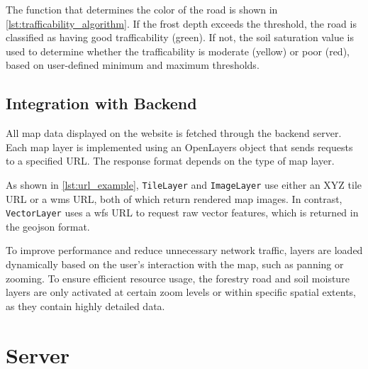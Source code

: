 The function that determines the color of the road is shown in \autoref{lst:trafficability_algorithm}. If the frost depth exceeds the threshold, the road is classified as having good trafficability (green). If not, the soil saturation value is used to determine whether the trafficability is moderate (yellow) or poor (red), based on user-defined minimum and maximum thresholds.

\begin{figure}[h]

\end{figure}

\begin{figure}[h]

\end{figure}

\subsection{Integration with Backend}

All map data displayed on the website is fetched through the backend server. Each map layer is implemented using an OpenLayers object that sends requests to a specified URL. The response format depends on the type of map layer.

As shown in \autoref{lst:url_example}, \texttt{TileLayer} and \texttt{ImageLayer} use either an XYZ tile URL or a \gls{wms} URL, both of which return rendered map images. In contrast, \texttt{VectorLayer} uses a \gls{wfs} URL to request raw vector features, which is returned in the \gls{geojson} format.

\begin{figure}[h]

\end{figure}

To improve performance and reduce unnecessary network traffic, layers are loaded dynamically based on the user's interaction with the map, such as panning or zooming. To ensure efficient resource usage, the forestry road and soil moisture layers are only activated at certain zoom levels or within specific spatial extents, as they contain highly detailed data.

\section{Server}\label{sec:implementation:server}

